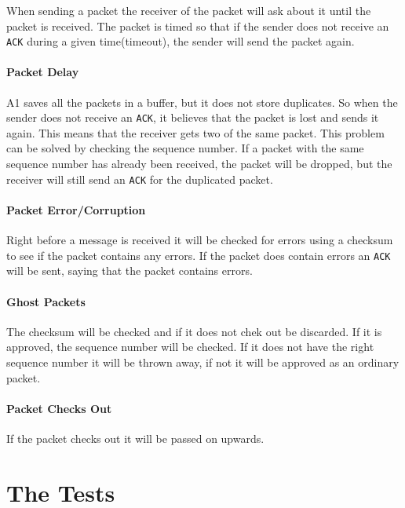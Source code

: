 \documentclass{article}
\begin{document}
When sending a packet the receiver of the packet will ask about it until the
packet is received. The packet is timed so that if the sender does not
receive an \texttt{ACK} during a given time(timeout), the sender will send
the packet again.

\subsection{Packet Delay}

A1 saves all the packets in a buffer, but it does not store duplicates. So
when the sender does not receive an \texttt{ACK}, it believes that the
packet is lost and sends it again. This means that the receiver gets two of
the same packet. This problem can be solved by checking the sequence number.
If a packet with the same sequence number has already been received, the
packet will be dropped, but the receiver will still send an \texttt{ACK} for
the duplicated packet.

\subsection{Packet Error/Corruption}

Right before a message is received it will be checked for errors using a
checksum to see if the packet contains any errors. If the packet does
contain errors an \texttt{ACK} will be sent, saying that the packet contains
errors.

\subsection{Ghost Packets}

The checksum will be checked and if it does not chek out be discarded. If it
is approved, the sequence number will be checked. If it does not have the
right sequence number it will be thrown away, if not it will be approved as
an ordinary packet.

\subsection{Packet Checks Out}

If the packet checks out it will be passed on upwards.

\newpage
\part{The Tests}
\end{document}
